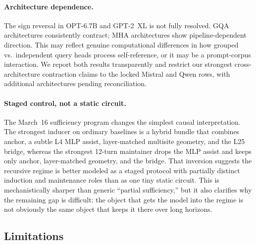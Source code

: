 \documentclass{article}
\begin{document}
\paragraph{Architecture dependence.}
The sign reversal in OPT-6.7B and GPT-2~XL is not fully resolved.
GQA architectures consistently contract; MHA architectures show pipeline-dependent direction.
This may reflect genuine computational differences in how grouped vs.\ independent query heads
process self-reference, or it may be a prompt-corpus interaction.
We report both results transparently and restrict our strongest cross-architecture contraction
claims to the locked Mistral and Qwen rows, with additional architectures pending reconciliation.

\paragraph{Staged control, not a static circuit.}
The March~16 sufficiency program changes the simplest causal interpretation.
The strongest inducer on ordinary baselines is a hybrid bundle that combines anchor, a subtle
L4 MLP assist, layer-matched multisite geometry, and the L25 bridge, whereas the strongest
12-turn maintainer drops the MLP assist and keeps only anchor, layer-matched geometry, and the
bridge.
That inversion suggests the recursive regime is better modeled as a staged protocol with partially
distinct induction and maintenance roles than as one tiny static circuit.
This is mechanistically sharper than generic ``partial sufficiency,'' but it also clarifies why the
remaining gap is difficult: the object that gets the model into the regime is not obviously the
same object that keeps it there over long horizons.

\subsection{Limitations}
\end{document}
